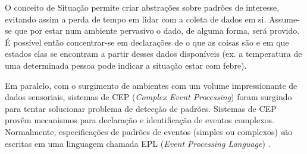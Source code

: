 \documentclass[
	12pt,				%
	openright,			%
	twoside,			%
	a4paper,			%
	english,			%
	french,				%
	spanish,			%
	brazil,				%
	]{abntex2}
\begin{document}
O conceito de Situação permite criar abstrações sobre padrões de interesse, evitando assim a perda de tempo em lidar com a coleta de dados em si. Assume-se que por estar num ambiente pervasivo o dado, de alguma forma, será provido. É possível então concentrar-se em declarações de o que as coisas são e em que estados elas se encontram a partir desses dados disponíveis (ex. a temperatura de uma determinada pessoa pode indicar a situação estar com febre).
% 
% 
% 
% 
% 
% 

Em paralelo, com o surgimento de ambientes com um volume impressionante de dados sensoriais, sistemas de CEP (\textit{Complex Event Processing}) foram surgindo para tentar solucionar problema de detecção de padrões. Sistemas de CEP provêm mecanismos para declaração e identificação de eventos complexos. Normalmente, especificações de padrões de eventos (simples ou complexos) são escritas em uma linguagem chamada EPL (\textit{Event Processing Language}) \cite{etzion-2010}.
% 
% 
\end{document}
